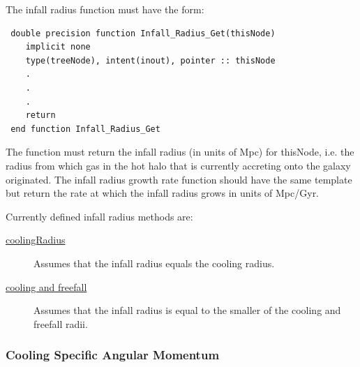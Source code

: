 The infall radius function must have the form:
\begin{verbatim}
 double precision function Infall_Radius_Get(thisNode)
    implicit none
    type(treeNode), intent(inout), pointer :: thisNode
    .
    .
    .
    return
 end function Infall_Radius_Get
\end{verbatim}
The function must return the infall radius (in units of Mpc) for {\normalfont \ttfamily thisNode}, i.e. the radius from which gas in the hot halo that is currently accreting onto the galaxy originated. The infall radius growth rate function should have the same template but return the rate at which the infall radius grows in units of Mpc/Gyr.

Currently defined infall radius methods are:
\begin{description}
 \item [\hyperlink{cooling.infall_radius.cooling_radius.F90:infall_radii_cooling_radius:infall_radius_cooling_radius}{{\normalfont \ttfamily coolingRadius}}] Assumes that the infall radius equals the cooling radius.
 \item [\hyperlink{cooling.infall_radius.cooling_and_freefall.F90:infall_radii_cooling_freefall:infall_radius_cooling_freefall}{{\normalfont \ttfamily cooling and freefall}}] Assumes that the infall radius is equal to the smaller of the cooling and freefall radii.
\end{description}

\subsubsection{Cooling Specific Angular Momentum}

